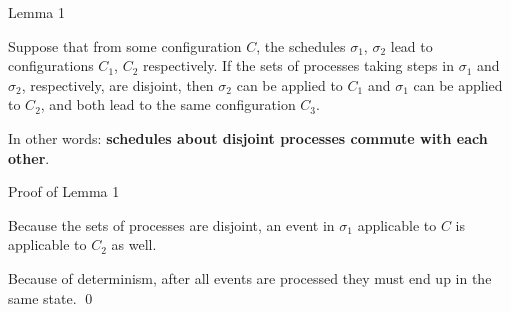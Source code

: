\documentclass[12pt]{beamer}
\begin{document}
  \begin{frame}{Lemma 1}
    \begin{lemma}
      Suppose that from some configuration \(C\), the schedules \(\sigma_1\),
      \(\sigma_2\) lead to configurations \(C_1\), \(C_2\) respectively. If the
      sets of processes taking steps in \(\sigma_1\) and \(\sigma_2\),
      respectively, are disjoint, then \(\sigma_2\) can be applied to \(C_1\)
      and \(\sigma_1\) can be applied to \(C_2\), and both lead to the same
      configuration \(C_3\).
    \end{lemma}

    \vspace{0.25cm}

    In other words: \textbf{schedules about disjoint processes commute with
    each other}.
  \end{frame}

  \begin{frame}{Proof of Lemma 1}
    \begin{figure}
    \end{figure}

    Because the sets of processes are disjoint, an event in \(\sigma_1\)
    applicable to \(C\) is applicable to \(C_2\) as well.

    \vspace{0.25cm}

    Because of determinism, after all events are processed they must end up in
    the same state. \qed

  \end{frame}
\end{document}
